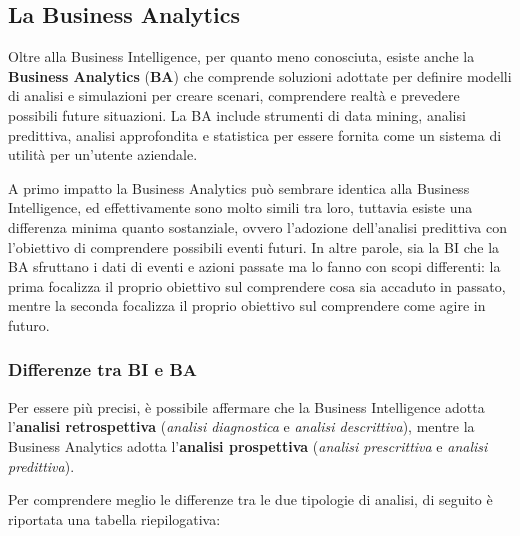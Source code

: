 \subsection{La Business Analytics}

Oltre alla Business Intelligence, per quanto meno conosciuta, esiste anche la \textbf{Business Analytics} (\textbf{BA}) che comprende soluzioni adottate per definire modelli di analisi e simulazioni per creare scenari, comprendere realtà e prevedere possibili future situazioni. La BA include strumenti di data mining, analisi predittiva, analisi approfondita e statistica per essere fornita come un sistema di utilità per un'utente aziendale.\cite{gartner_ba}

A primo impatto la Business Analytics può sembrare identica alla Business Intelligence, ed effettivamente sono molto simili tra loro, tuttavia esiste una differenza minima quanto sostanziale, ovvero l'adozione dell'analisi predittiva con l'obiettivo di comprendere possibili eventi futuri. In altre parole, sia la BI che la BA sfruttano i dati di eventi e azioni passate ma lo fanno con scopi differenti: la prima focalizza il proprio obiettivo sul comprendere cosa sia accaduto in passato, mentre la seconda focalizza il proprio obiettivo sul comprendere come agire in futuro.\cite{talend_bi_vs_ba} 


\subsubsection{Differenze tra BI e BA}
Per essere più precisi, è possibile affermare che la Business Intelligence adotta l'\textbf{analisi retrospettiva} (\textit{analisi diagnostica} e \textit{analisi descrittiva}), mentre la Business Analytics adotta l'\textbf{analisi prospettiva} (\textit{analisi prescrittiva} e \textit{analisi predittiva}).\cite{researchgate_bi_and_ba_analytics}

Per comprendere meglio le differenze tra le due tipologie di analisi, di seguito è riportata una tabella riepilogativa:\cite{knowledgehut_bi_vs_ba}

